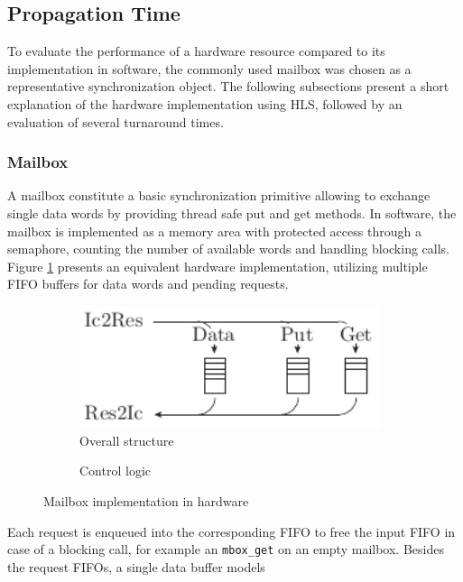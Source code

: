 \subsection{Propagation Time}
To evaluate the performance of a hardware resource compared to its
implementation in software, the commonly used mailbox was chosen as a
representative synchronization object. The following subsections present a
short explanation of the hardware implementation using \ac{HLS}, followed by
an evaluation of several turnaround times.
\subsubsection{Mailbox}
A mailbox constitute a basic synchronization primitive allowing to exchange
single data words by providing thread safe put and get methods. In software,
the mailbox is implemented as a memory area with protected access through a
semaphore, counting the number of available words and handling blocking calls.
Figure \ref{fig:mbox_hw_struct} presents an equivalent hardware
implementation, utilizing multiple \ac{FIFO} buffers for data words and
pending requests.
\begin{figure}
	\centering
	\begin{subfigure}{0.49\textwidth}
		\centering
		\includegraphics[width=0.97\textwidth]{../figures/mbox_hw_struct}
		\caption{Overall structure}
		\label{fig:mbox_hw_struct}
	\end{subfigure}
	\begin{subfigure}{0.49\textwidth}
		\centering
		\caption{Control logic}
		\label{fig:mbox_hw_fsm}
	\end{subfigure}
	\caption{Mailbox implementation in hardware}
	\label{fig:mbox_hw}
\end{figure}
Each request is enqueued into the corresponding \ac{FIFO} to free the input
\ac{FIFO} in case of a blocking call, for example an \lstinline{mbox_get} on
an empty mailbox. Besides the request \acp{FIFO}, a single data buffer models
